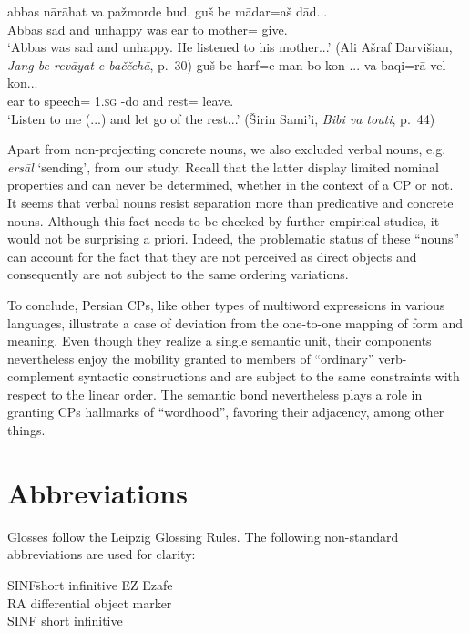 \documentclass[output=paper]{langsci/langscibook}
\begin{document}
\begin{description}
\begin{exe}
	\ex
	\gll abbas n\=ar\=ahat va pa\v{z}morde bud. gu\v{s} be m\=adar=a\v{s} d\=ad...\\
	Abbas sad and unhappy was ear to mother= give.\\
	\glt`Abbas was sad and unhappy. He listened to his mother...' 	\hfill (Ali A\v{s}raf Darvi\v{s}ian, \textit{Jang be rev\=ayat-e ba\v{c}\v{c}eh\=a}, p.~30) 
	\ex
	\gll gu\v{s} be harf=e man bo-kon ... va baqi=r\=a vel-kon...\\
	ear to speech= \textsc{1.sg} -do {} and rest= leave.\\
	\glt`Listen to me (...) and let go of the rest...' 	\hfill (\v{S}irin Sami'i, \textit{Bibi va touti}, p.~44) 
\end{exe}

Apart from non-projecting concrete nouns, we also excluded verbal
nouns, e.g. \textit{ers\=al} `sending', from our study. Recall that the
latter display limited nominal properties and can never be determined,
whether in the context of a CP or not. It seems that verbal nouns resist separation more than predicative and concrete nouns. Although this fact
needs to be checked by further empirical studies, it would not be
surprising a priori. Indeed, the problematic status of these ``nouns''
can account for the fact that they are not perceived as direct objects
and consequently are not subject to the same ordering variations.
\end{description}

To conclude, Persian CPs, like other types of multiword expressions in
various languages, illustrate a case of deviation from the one-to-one
mapping of form and meaning. Even though they realize a
single semantic unit, their components nevertheless enjoy the mobility
granted to members of ``ordinary'' verb-complement syntactic
constructions and are subject to the same constraints with respect to the
linear order. The semantic bond nevertheless plays a role in granting
CPs hallmarks of ``wordhood'', favoring their adjacency, among other
things.

\section*{Abbreviations}
Glosses follow the Leipzig Glossing Rules. The following non-standard abbreviations are used for clarity:  

\begin{tabbing}
SINF\quad\= short infinitive\kill
EZ   \> Ezafe\\
RA   \> differential object marker\\
SINF \> short infinitive
\end{tabbing}
\end{document}
